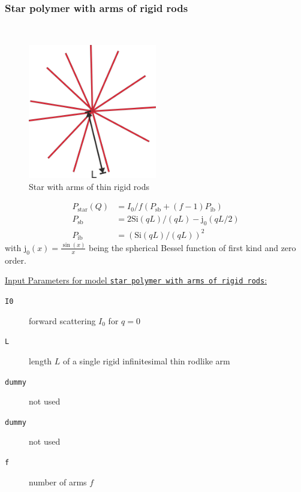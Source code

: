 \clearpage


\clearpage
\subsubsection{Star polymer with arms of rigid rods}
\label{sect:StarRigidRods}
~\\
\cite{Huber1989}

\begin{figure}[htb]
\begin{center}
\includegraphics[width=0.5\textwidth]{broken_rods_star.png}
\end{center}
\caption{Star with arms of thin rigid rods} \label{fig:broken_rods_star}
\end{figure}

\begin{align}
 P_\mathrm{star}(Q) &= I_0/f\left(P_\mathrm{sb} + (f-1)P_\mathrm{ib} \right) \\
 P_\mathrm{sb} &= 2 \mathrm{Si}(qL)/(qL)-\mathrm{j}_0(qL/2) \\
 P_\mathrm{ib} &= \left( \mathrm{Si}(qL)/(qL)\right)^2
\end{align}
with $\mathrm{j}_0(x)=\frac{\sin(x)}{x}$ being the spherical Bessel function of first kind and zero order.

\vspace{5mm}

\noindent
\uline{Input Parameters for model \texttt{star polymer with arms of rigid rods}:}
\begin{description}
\item[\texttt{I0}] forward scattering $I_0$ for $q=0$
\item[\texttt{L}]length $L$ of a single rigid infinitesimal thin rodlike arm
\item[\texttt{dummy}] not used
\item[\texttt{dummy}] not used
\item[\texttt{f}] number of arms $f$
\end{description}

